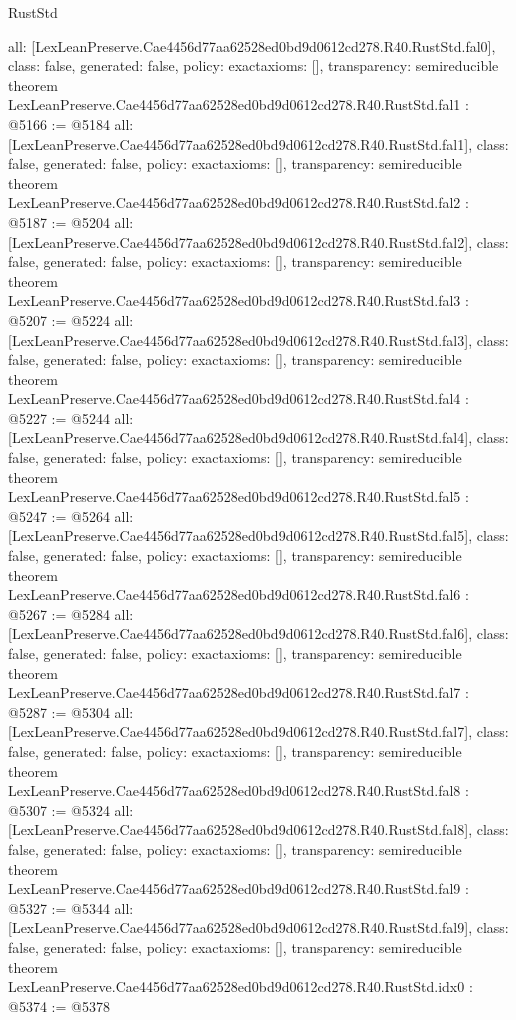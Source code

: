 \begin{lexlean}{RustStd}
\begin{coremodule}
{  all: [LexLeanPreserve.Cae4456d77aa62528ed0bd9d0612cd278.R40.RustStd.fal0],
  class: false,
  generated: false,
  policy: exact{axioms: []},
  transparency: semireducible
}
theorem LexLeanPreserve.Cae4456d77aa62528ed0bd9d0612cd278.R40.RustStd.fal1 : @5166 := @5184 {
  all: [LexLeanPreserve.Cae4456d77aa62528ed0bd9d0612cd278.R40.RustStd.fal1],
  class: false,
  generated: false,
  policy: exact{axioms: []},
  transparency: semireducible
}
theorem LexLeanPreserve.Cae4456d77aa62528ed0bd9d0612cd278.R40.RustStd.fal2 : @5187 := @5204 {
  all: [LexLeanPreserve.Cae4456d77aa62528ed0bd9d0612cd278.R40.RustStd.fal2],
  class: false,
  generated: false,
  policy: exact{axioms: []},
  transparency: semireducible
}
theorem LexLeanPreserve.Cae4456d77aa62528ed0bd9d0612cd278.R40.RustStd.fal3 : @5207 := @5224 {
  all: [LexLeanPreserve.Cae4456d77aa62528ed0bd9d0612cd278.R40.RustStd.fal3],
  class: false,
  generated: false,
  policy: exact{axioms: []},
  transparency: semireducible
}
theorem LexLeanPreserve.Cae4456d77aa62528ed0bd9d0612cd278.R40.RustStd.fal4 : @5227 := @5244 {
  all: [LexLeanPreserve.Cae4456d77aa62528ed0bd9d0612cd278.R40.RustStd.fal4],
  class: false,
  generated: false,
  policy: exact{axioms: []},
  transparency: semireducible
}
theorem LexLeanPreserve.Cae4456d77aa62528ed0bd9d0612cd278.R40.RustStd.fal5 : @5247 := @5264 {
  all: [LexLeanPreserve.Cae4456d77aa62528ed0bd9d0612cd278.R40.RustStd.fal5],
  class: false,
  generated: false,
  policy: exact{axioms: []},
  transparency: semireducible
}
theorem LexLeanPreserve.Cae4456d77aa62528ed0bd9d0612cd278.R40.RustStd.fal6 : @5267 := @5284 {
  all: [LexLeanPreserve.Cae4456d77aa62528ed0bd9d0612cd278.R40.RustStd.fal6],
  class: false,
  generated: false,
  policy: exact{axioms: []},
  transparency: semireducible
}
theorem LexLeanPreserve.Cae4456d77aa62528ed0bd9d0612cd278.R40.RustStd.fal7 : @5287 := @5304 {
  all: [LexLeanPreserve.Cae4456d77aa62528ed0bd9d0612cd278.R40.RustStd.fal7],
  class: false,
  generated: false,
  policy: exact{axioms: []},
  transparency: semireducible
}
theorem LexLeanPreserve.Cae4456d77aa62528ed0bd9d0612cd278.R40.RustStd.fal8 : @5307 := @5324 {
  all: [LexLeanPreserve.Cae4456d77aa62528ed0bd9d0612cd278.R40.RustStd.fal8],
  class: false,
  generated: false,
  policy: exact{axioms: []},
  transparency: semireducible
}
theorem LexLeanPreserve.Cae4456d77aa62528ed0bd9d0612cd278.R40.RustStd.fal9 : @5327 := @5344 {
  all: [LexLeanPreserve.Cae4456d77aa62528ed0bd9d0612cd278.R40.RustStd.fal9],
  class: false,
  generated: false,
  policy: exact{axioms: []},
  transparency: semireducible
}
theorem LexLeanPreserve.Cae4456d77aa62528ed0bd9d0612cd278.R40.RustStd.idx0 : @5374 := @5378 {
}
\end{coremodule}
\end{lexlean}

